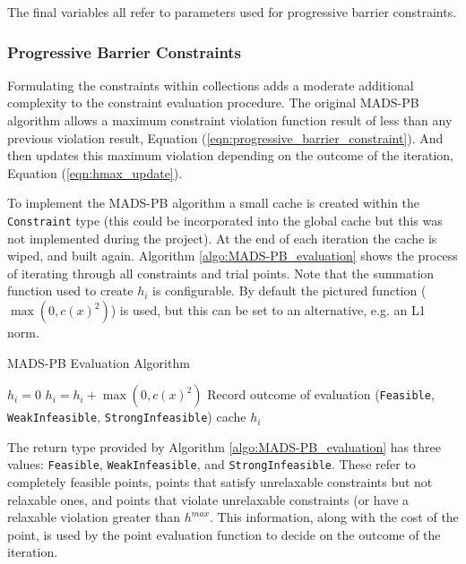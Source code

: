 The final variables all refer to parameters used for progressive barrier constraints.

\begin{figure}[tb]
    
\end{figure}

\subsubsection{Progressive Barrier Constraints}
Formulating the constraints within collections adds a moderate additional complexity to the constraint evaluation procedure. The original MADS-PB algorithm allows a maximum constraint violation function result of less than any previous violation result, Equation (\ref{eqn:progressive_barrier_constraint}). And then updates this maximum violation depending on the outcome of the iteration, Equation (\ref{eqn:hmax_update}).

To implement the MADS-PB algorithm a small cache is created within the \texttt{Constraint} type (this could be incorporated into the global cache but this was not implemented during the project). At the end of each iteration the cache is wiped, and built again. Algorithm \ref{algo:MADS-PB_evaluation} shows the process of iterating through all constraints and trial points. Note that the summation function used to create $h_i$ is configurable. By default the pictured function ($\max(0,c(x)^2)$) is used, but this can be set to an alternative, e.g. an L1 norm.

\begin{algorithm}
\caption{MADS-PB Evaluation Algorithm}
\label{algo:MADS-PB_evaluation}
\begin{algorithmic}
        \STATE $h_i = 0$
            \STATE $h_i = h_i + \max(0, c(x)^2)$
            \STATE Record outcome of evaluation (\texttt{Feasible}, \texttt{WeakInfeasible}, \texttt{StrongInfeasible})
        \ENDFOR
        \STATE cache $h_i$
    \ENDFOR
\ENDFOR
{}
\end{algorithmic}
\end{algorithm}

The return type provided by Algorithm \ref{algo:MADS-PB_evaluation} has three values: \texttt{Feasible}, \texttt{WeakInfeasible}, and \texttt{StrongInfeasible}. These refer to completely feasible points, points that satisfy unrelaxable constraints but not relaxable ones, and points that violate unrelaxable constraints (or have a relaxable violation greater than $h^{max}$. This information, along with the cost of the point, is used by the point evaluation function to decide on the outcome of the iteration.

